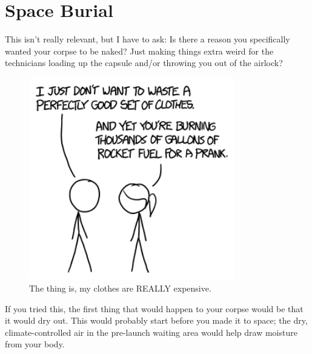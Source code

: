 {{
\chapter{Space Burial}
}

\hfill{}

{This isn't really relevant, but I have to ask: Is there a reason you specifically wanted your corpse to be naked? Just making things extra weird for the technicians loading up the capsule and/or throwing you out of the airlock?}

\begin{figure}[!htbp]
\centering
\includegraphics[scale=0.5, max width=0.8\textwidth]{imgs/a/134/naked.png}
\caption{The thing is, my clothes are REALLY expensive.}
\end{figure}

{If you tried this, the first thing that would happen to your corpse would be that it would dry out. This would probably start before you made it to space; the dry, climate-controlled air in the pre-launch waiting area would help draw moisture from your body.}

}
